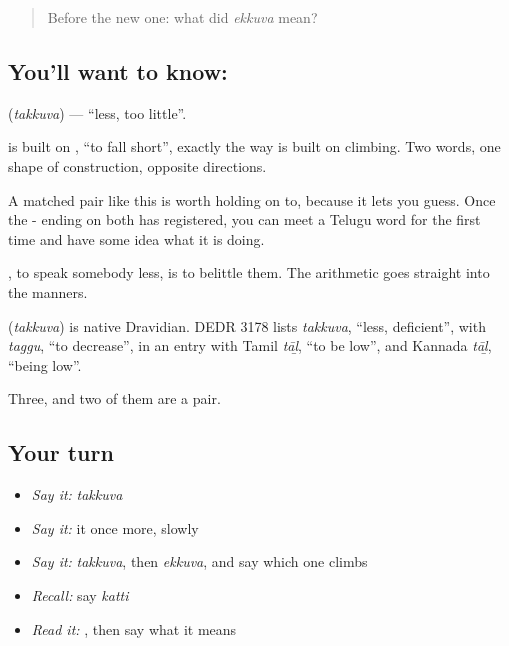 \label{lesson:TE-C58-less}



\begin{quote}
Before the new one: what did \emph{ekkuva} mean?
\end{quote}

\subsection*{You'll want to know: }
\textbf{} (\emph{takkuva}) — \textquotedblleft{}less, too little\textquotedblright{}.

 is built on , \textquotedblleft{}to fall short\textquotedblright{}, exactly the way  is built on climbing. Two words, one shape of construction, opposite directions.

A matched pair like this is worth holding on to, because it lets you guess. Once the - ending on both has registered, you can meet a Telugu word for the first time and have some idea what it is doing.

  , to speak somebody less, is to belittle them. The arithmetic goes straight into the manners.

\begin{cousinweb}
\textbf{} (\emph{takkuva}) is native Dravidian. DEDR 3178 lists \emph{takkuva}, \textquotedblleft{}less, deficient\textquotedblright{}, with \emph{taggu}, \textquotedblleft{}to decrease\textquotedblright{}, in an entry with Tamil \emph{tāḻ}, \textquotedblleft{}to be low\textquotedblright{}, and Kannada \emph{tāḻ}, \textquotedblleft{}being low\textquotedblright{}.
\end{cousinweb}

\begin{grammarlens}[title={What you've built}]
Three, and two of them are a pair.
\end{grammarlens}

\subsection*{Your turn}
\begin{itemize}
\raggedright
  \item \emph{Say it:} \emph{takkuva}
  \item \emph{Say it:} it once more, slowly
  \item \emph{Say it:} \emph{takkuva}, then \emph{ekkuva}, and say which one climbs
  \item \emph{Recall:} say \emph{katti}
  \item \emph{Read it:} \textbf{}, then say what it means
\end{itemize}

